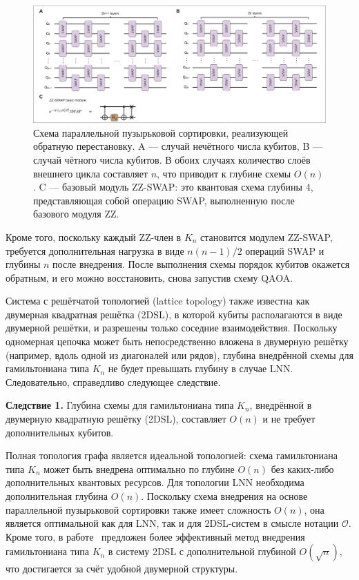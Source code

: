 \begin{figure}
    \centering
    \includegraphics[scale=0.35]{inc/fig_12.png}
    \caption{
    Схема параллельной пузырьковой сортировки, реализующей обратную
    перестановку. A — случай нечётного числа кубитов, B — случай чётного числа
    кубитов. В обоих случаях количество слоёв внешнего цикла составляет $n$,
    что приводит к глубине схемы $O(n)$. C — базовый модуль ZZ-SWAP: это
    квантовая схема глубины 4, представляющая собой операцию SWAP, выполненную
    после базового модуля ZZ.
    }
    \label{fig:fig12}
\end{figure}

Кроме того, поскольку каждый ZZ-член в $K_n$ становится модулем ZZ-SWAP,
требуется дополнительная нагрузка в виде $n(n-1)/2$ операций SWAP и глубины $n$
после внедрения. После выполнения схемы порядок кубитов окажется обратным, и
его можно восстановить, снова запустив схему QAOA.

Система с решётчатой топологией (lattice topology) также известна как двумерная
квадратная решётка (2DSL), в которой кубиты располагаются в виде двумерной
решётки, и разрешены только соседние взаимодействия. Поскольку одномерная
цепочка может быть непосредственно вложена в двумерную решётку (например, вдоль
одной из диагоналей или рядов), глубина внедрённой схемы для гамильтониана типа
$K_n$ не будет превышать глубину в случае LNN. Следовательно, справедливо
следующее следствие.

\textbf{Следствие 1.} Глубина схемы для гамильтониана типа $K_n$, внедрённой в
двумерную квадратную решётку (2DSL), составляет $O(n)$ и не требует
дополнительных кубитов.

Полная топология графа является идеальной топологией: схема гамильтониана типа
$K_n$ может быть внедрена оптимально по глубине $O(n)$ без каких-либо
дополнительных квантовых ресурсов. Для топологии LNN необходима дополнительная
глубина $O(n)$. Поскольку схема внедрения на основе параллельной пузырьковой
сортировки также имеет сложность $O(n)$, она является оптимальной как для LNN,
так и для 2DSL-систем в смысле нотации $\mathcal{O}$. Кроме того, в
работе~\cite{cite_55} предложен более эффективный метод внедрения гамильтониана
типа $K_n$ в систему 2DSL с дополнительной глубиной $O(\sqrt{n})$, что
достигается за счёт удобной двумерной структуры.

